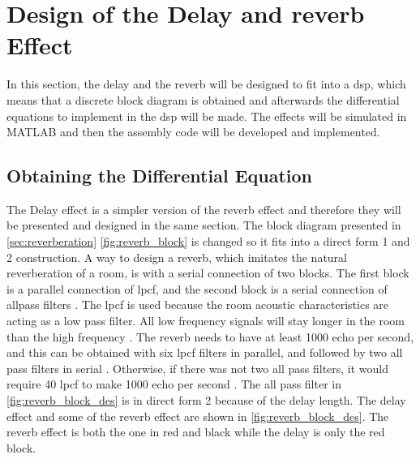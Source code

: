 \section{Design of the Delay and \gls{reverb} Effect}\label{sec:reverb_develop}
In this section, the delay and the \gls{reverb} will be designed to fit into a \gls{dsp}, which means that a discrete block diagram is obtained and afterwards the differential equations to implement in the \gls{dsp} will be made. The effects will be simulated in MATLAB and then the assembly code will be developed and implemented. 


\subsection{Obtaining the Differential Equation}
The Delay effect is a simpler version of the \gls{reverb} effect and therefore they will be presented and designed in the same section. The block diagram presented in \autoref{sec:reverberation} \autoref{fig:reverb_block} is changed so it fits into a direct form 1 and 2 construction.
A way to design a \gls{reverb}, which imitates the natural reverberation of a room, is with a serial connection of two blocks. The first block is a parallel connection of \gls{lpcf}, and the second block is a serial connection of allpass filters \citep{natural_sounding_revorb}. 
The \gls{lpcf} is used because the room acoustic characteristics are acting as a low pass filter. All low frequency signals will stay longer in the room than the high frequency \citep{rfi}. The \gls{reverb} needs to have at least 1000 echo per second, and this can be obtained with six \gls{lpcf} filters in parallel, and followed by two all pass filters in serial \citep{DAFX}. Otherwise, if there was not two all pass filters, it would require 40 \gls{lpcf} to make 1000 echo per second \citep{natural_sounding_revorb}. The all pass filter in \autoref{fig:reverb_block_des} is in direct form 2 because of the delay length. The delay effect and some of the \gls{reverb} effect are shown in \autoref{fig:reverb_block_des}. The \gls{reverb} effect is both the one in red and black while the delay is only the red block. 

\newpage

